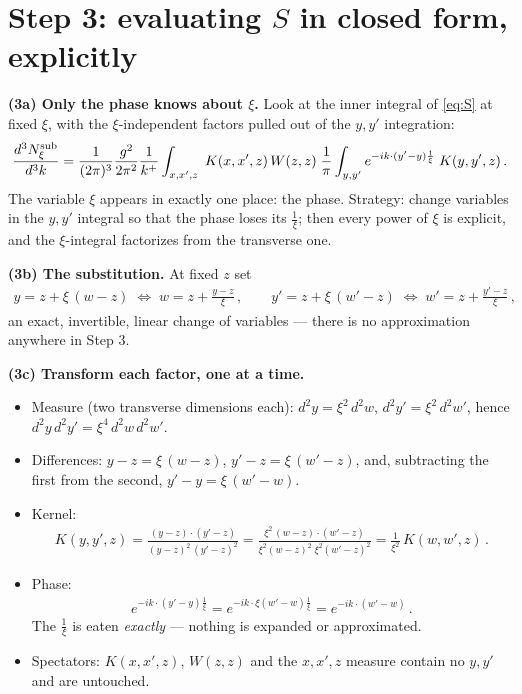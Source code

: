 \documentclass[10pt]{article}
\begin{document}
\section{Step 3: evaluating $S$ in closed form, explicitly}

\textbf{(3a) Only the phase knows about $\xi$.} Look at the inner integral of \eqref{eq:S} at
fixed $\xi$, with the $\xi$-independent factors pulled out of the $y,y'$ integration:
\begin{align}\label{eq:inner}
\frac{d^{3}N^{\rm sub}_{\xi}}{d^{3}k}
=\frac{1}{(2\pi)^{3}}\frac{g^{2}}{2\pi^{2}}\frac{1}{k^{+}}
\int_{x,x',z}\;K(x,x',z)\,W(z,z)\;\frac{1}{\pi}
\int_{y,y'} e^{-ik\cdot(y'-y)\frac{1}{\xi}}\;K(y,y',z)\,.
\end{align}
The variable $\xi$ appears in exactly one place: the phase. Strategy: change variables in the
$y,y'$ integral so that the phase loses its $\frac{1}{\xi}$; then every power of $\xi$ is
explicit, and the $\xi$-integral factorizes from the transverse one.

\textbf{(3b) The substitution.} At fixed $z$ set
\begin{align}\label{eq:rescale}
y=z+\xi\,(w-z)\;\Longleftrightarrow\;w=z+\frac{y-z}{\xi}\,,\qquad
y'=z+\xi\,(w'-z)\;\Longleftrightarrow\;w'=z+\frac{y'-z}{\xi}\,,
\end{align}
an exact, invertible, linear change of variables --- there is no approximation anywhere in
Step 3.

\textbf{(3c) Transform each factor, one at a time.}
\begin{itemize}
\item[(i)] Measure (two transverse dimensions each): $d^{2}y=\xi^{2}\,d^{2}w$,
$d^{2}y'=\xi^{2}\,d^{2}w'$, hence $d^{2}y\,d^{2}y'=\xi^{4}\,d^{2}w\,d^{2}w'$.
\item[(ii)] Differences: $y-z=\xi\,(w-z)$, $y'-z=\xi\,(w'-z)$, and, subtracting the first from
the second, $y'-y=\xi\,(w'-w)$.
\item[(iii)] Kernel:
\begin{align}
K(y,y',z)=\frac{(y-z)\cdot(y'-z)}{(y-z)^{2}\,(y'-z)^{2}}
=\frac{\xi^{2}\,(w-z)\cdot(w'-z)}{\xi^{2}(w-z)^{2}\;\xi^{2}(w'-z)^{2}}
=\frac{1}{\xi^{2}}\,K(w,w',z)\,.
\end{align}
\item[(iv)] Phase:
\begin{align}
e^{-ik\cdot(y'-y)\frac{1}{\xi}}=e^{-ik\cdot\xi(w'-w)\frac{1}{\xi}}=e^{-ik\cdot(w'-w)}\,.
\end{align}
The $\frac{1}{\xi}$ is eaten \emph{exactly} --- nothing is expanded or approximated.
\item[(v)] Spectators: $K(x,x',z)$, $W(z,z)$ and the $x,x',z$ measure contain no $y,y'$ and are
untouched.
\end{itemize}
\end{document}
